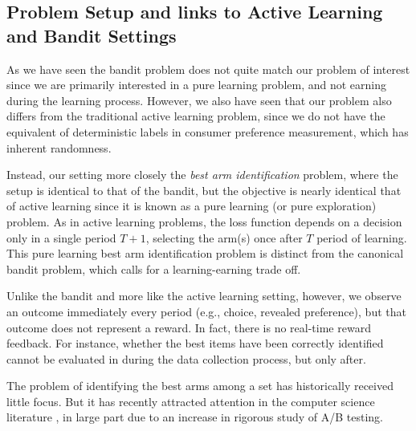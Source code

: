 \documentclass[blindrev,mnsc]{informs3}
\begin{document}
\subsection{Problem Setup and links to Active Learning and Bandit Settings}

As we have seen the bandit problem does not quite match our problem of interest since we are primarily interested in a pure learning problem, and not earning during the learning process. However, we also have seen that our problem also differs from the traditional active learning problem, since we do not have the equivalent of deterministic labels in consumer preference measurement, which has inherent randomness. 

Instead, our setting more closely the \emph{best arm identification} problem, where the setup is identical to that of the bandit, but the objective is nearly identical that of active learning since it is known as a pure learning (or pure exploration) problem. As in active learning problems, the loss function depends on a decision only in a single period $T+1$, selecting the arm(s) once after $T$ period of learning. This pure learning best arm identification problem is distinct from the canonical bandit problem, which calls for a learning-earning trade off. 

Unlike the bandit and more like the active learning setting, however, we observe an outcome immediately every period (e.g., choice, revealed preference), but that outcome does not represent a reward. In fact, there is no real-time reward feedback. For instance, whether the best items have been correctly identified cannot be evaluated in during the data collection process, but only after.

The problem of identifying the best arms among a set has historically received little focus. But it has recently attracted attention in the computer science literature \citep{gabillon2012best,jamieson2014lil,kalyanakrishnan2012pac,kaufmann2016complexity,kaufmann2013information,russo2018simple}, in large part due to an increase in rigorous study of A/B testing. 

\end{document}
